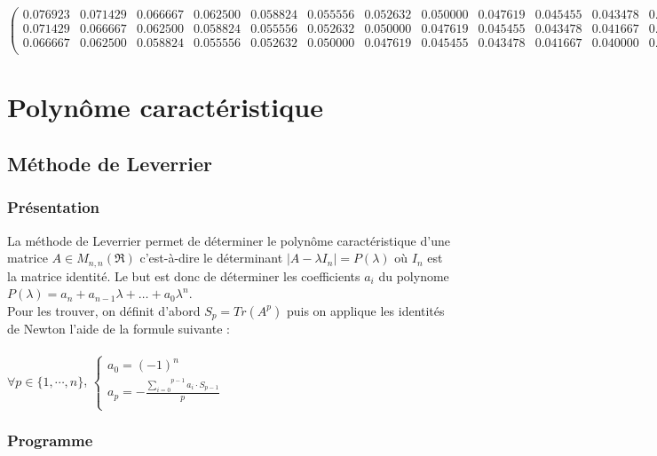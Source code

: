 \documentclass{report}
\begin{document}
\begin{equation}
\begin{pmatrix}
	  0.076923 & 0.071429 & 0.066667 & 0.062500 & 0.058824 & 0.055556 & 0.052632 & 0.050000 & 0.047619 & 0.045455 & 0.043478 & 0.041667 & 0.040000 & 0.038462 & 0.037037 \\ 
	  0.071429 & 0.066667 & 0.062500 & 0.058824 & 0.055556 & 0.052632 & 0.050000 & 0.047619 & 0.045455 & 0.043478 & 0.041667 & 0.040000 & 0.038462 & 0.037037 & 0.035714 \\ 
	  0.066667 & 0.062500 & 0.058824 & 0.055556 & 0.052632 & 0.050000 & 0.047619 & 0.045455 & 0.043478 & 0.041667 & 0.040000 & 0.038462 & 0.037037 & 0.035714 & 0.034483 \\ 
	\end{pmatrix}
	\label{syst5}
      \end{equation}
      \normalsize

  \chapter{Polynôme caractéristique}
    \section{Méthode de Leverrier}
      \subsection{Présentation}
      
      La méthode de Leverrier permet de déterminer le polynôme caractéristique d'une matrice $A \in M_{n,n}(\Re)$ c'est-à-dire le déterminant $|A-\lambda I_n| = P(\lambda)$ où $I_n$ est la matrice identité. Le but est donc de déterminer les coefficients $a_i$ du polynome $P(\lambda) = a_n + a_{n-1}\lambda + \dots + a_{0}\lambda^n$.\\
      
      Pour les trouver, on définit d'abord $S_p = Tr(A^p)$ puis on applique les identités de Newton l'aide de la formule suivante : \\ \\
      $\forall p \in \{1,\cdots,n\}$, \indent
      $\left\{
      \begin{array}{l }
	a_{0} = (-1)^n \\
	a_{p} = -\frac{{\overset{p-1}{\underset{i=0}{\sum}}} a_{i} \cdot S_{p-1}} {p} \\
	\end{array} \right.$
      \subsection{Programme}
	
\end{document}
